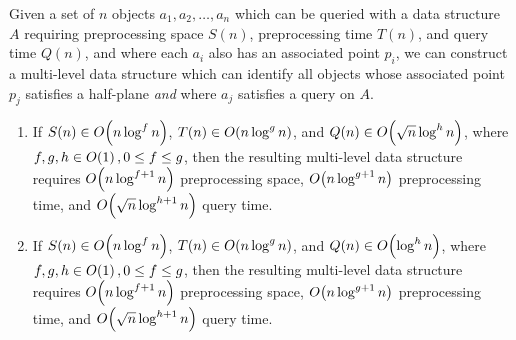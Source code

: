 \begin{corollary}
\label{cor:multichan}

Given a set of $n$ objects $a_1, a_2, \ldots, a_n$ which can be queried with a data structure $A$ requiring preprocessing space $S(n)$, preprocessing time $T(n)$, and query time $Q(n)$, and where each $a_i$ also has an associated point $p_i$, we can construct a multi-level data structure which can identify all objects whose associated point $p_j$ satisfies a half-plane  \emph{and} where $a_j$ satisfies a query on $A$.

\begin{enumerate}
\item If $S(n) \in O\!\left(n \log^f{n}\right)$, $T(n) \in O\!\left(n \log^g{n}\right)$, and $Q(n) \in O\!\left(\sqrt{n} \log^h{n}\right)$, where $f, g, h \in O\!\left(1\right), 0 \leq f \leq g$, then the resulting multi-level data structure requires $O\!\left(n\log^{f+1}{n}\right)$ preprocessing space, $O\!\left(n\log^{g+1}{n}\right)$ preprocessing time, and $O\!\left(\sqrt{n}\log^{h+1}{n}\right)$ query time.

\item If $S(n) \in O\!\left(n \log^f{n}\right)$, $T(n) \in O\!\left(n \log^g{n}\right)$, and $Q(n) \in O\!\left(\log^h{n}\right)$, where $f, g, h \in O\!\left(1\right), 0 \leq f \leq g$, then the resulting multi-level data structure requires $O\!\left(n\log^{f+1}{n}\right)$ preprocessing space, $O\!\left(n\log^{g+1}{n}\right)$ preprocessing time, and $O\!\left(\sqrt{n}\log^{h+1}{n}\right)$ query time.

\end{enumerate}
\end{corollary}

